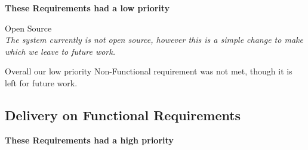 \textbf{These Requirements had a low priority}

\begin{requirementsrevisit}[resume]

    \item Open Source \label{opensource} \\
	\textit{The system currently is not open source, however this is a simple change to make which we leave to future work.}

Overall our low priority Non-Functional requirement was not met, though it is left for future work.

\end{requirementsrevisit}


\subsection{Delivery on Functional Requirements}
\textbf{These Requirements had a high priority}

